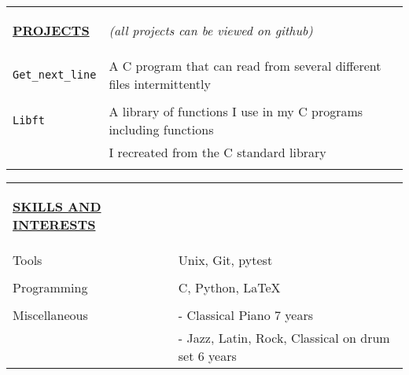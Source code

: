 \documentclass{article}
\begin{document}
\bigskip

\begin{tabular}{ m{16em} l }
    {\begin{large} \underline{\textbf{PROJECTS}} \end{large}} \smallskip & \textit{(all projects can be viewed on github)} \smallskip \\
    \verb!Get_next_line! & A C program that can read from several different files intermittently \\
     & \\
    \verb!Libft! & A library of functions I use in my C programs including functions \\
     & I recreated from the C standard library \\
     & \\
\end{tabular}

\bigskip

\begin{tabular}{ m{16em} l }
    {\begin{large} \underline{\textbf{SKILLS AND INTERESTS}} \end{large}} \smallskip & \smallskip \\
    Tools &  Unix, Git, pytest \\
     & \\
    Programming & C, Python, \LaTeX \\
     & \\
    Miscellaneous & - Classical Piano 7 years \\
     & - Jazz, Latin, Rock, Classical on drum set 6 years
\end{tabular}
\end{document}
